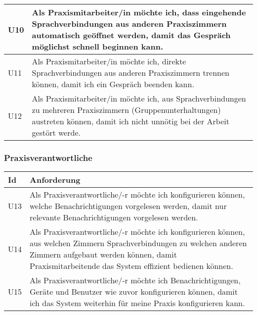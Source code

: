 \begin{table}[h]
\begin{tabular}{|l|p{15cm}|}
        \hline
        U10 & Als Praxismitarbeiter/in möchte ich, dass eingehende Sprachverbindungen aus anderen Praxiszimmern automatisch geöffnet werden, damit das Gespräch möglichst schnell beginnen kann.        \\
        \hline
        U11 & Als Praxismitarbeiter/in möchte ich, direkte Sprachverbindungen aus anderen Praxiszimmern trennen können, damit ich ein Gespräch beenden kann.                                          \\
        \hline
        U12 & Als Praxismitarbeiter/in möchte ich, aus Sprachverbindungen zu mehreren Praxiszimmern (Gruppenunterhaltungen) austreten können, damit ich nicht unnötig bei der Arbeit gestört werde.  \\
        \hline
    \end{tabular}\label{tab:userstories0}
\end{table}

\clearpage

\subsubsection{Praxisverantwortliche}

\begin{table}[h]
    \centering
    \begin{tabular}{|l|p{15cm}|}
        \hline
        \textbf{Id} & \textbf{Anforderung}                                                                                                                                                                                                    \\
        \hline
        U13         & Als Praxisverantwortliche/-r möchte ich konfigurieren können, welche Benachrichtigungen vorgelesen werden, damit nur relevante Benachrichtigungen vorgelesen werden.                       \\
        \hline
        U14         & Als Praxisverantwortliche/-r möchte ich konfigurieren können, aus welchen Zimmern Sprachverbindungen zu welchen anderen Zimmern aufgebaut werden können, damit Praxismitarbeitende das System effizient bedienen können.     \\
        \hline
        U15         & Als Praxisverantwortliche/-r möchte ich Benachrichtigungen, Geräte und Benutzer wie zuvor konfigurieren können, damit ich das System weiterhin für meine Praxis konfigurieren kann. \\
        \hline
    \end{tabular}\label{tab:userstories2}
\end{table}

